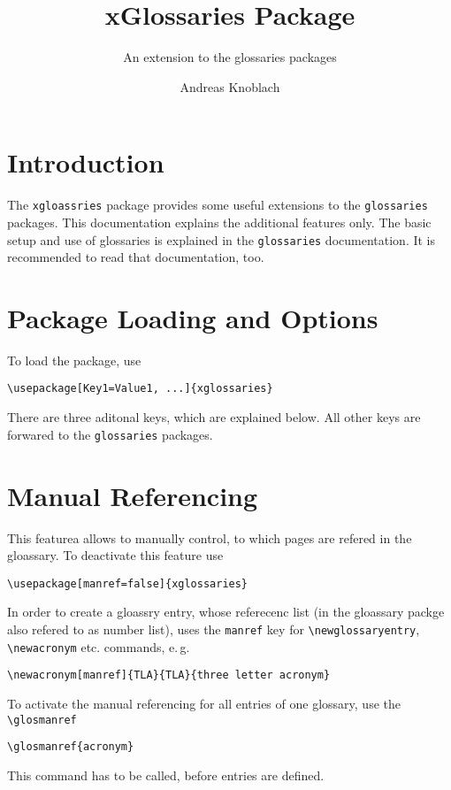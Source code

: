 \documentclass{scrartcl}
\title{xGlossaries Package}
\subtitle{An extension to the glossaries packages}
\author{Andreas Knoblach}
\begin{document}
\glsaddall

%
%
\maketitle

%
%
\section{Introduction}
The \texttt{xgloassries} package provides some useful extensions to the \texttt{glossaries} packages. This documentation explains the additional features only. The basic setup and use of glossaries is explained in the \texttt{glossaries} documentation. It is recommended to read that documentation, too.

%
%
\section{Package Loading and Options}
To load the package, use
\begin{lstlisting}
\usepackage[Key1=Value1, ...]{xglossaries}
\end{lstlisting}
There are three aditonal keys, which are explained below. All other keys are forwared to the \texttt{glossaries} packages.

%
%
\section{Manual Referencing}
This featurea allows to manually control, to which pages are refered in the gloassary. To deactivate this feature use
\begin{lstlisting}
\usepackage[manref=false]{xglossaries}
\end{lstlisting}

In order to create a gloassry entry, whose referecenc list (in the gloassary packge also refered to as number list), uses the \texttt{manref} key for \texttt{\textbackslash newglossaryentry}, \texttt{\textbackslash newacronym} etc. commands,  e.\,g.
\begin{lstlisting}
\newacronym[manref]{TLA}{TLA}{three letter acronym}
\end{lstlisting}
To activate the manual referencing for all entries of one glossary, use the \texttt{\textbackslash glosmanref}
\begin{lstlisting}
\glosmanref{acronym}
\end{lstlisting}
This command has to be called, before entries are defined.
\end{document}
